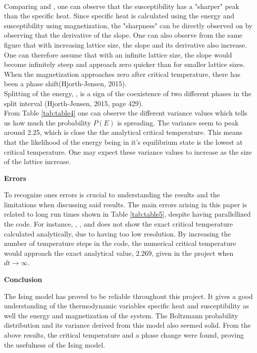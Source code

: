 \documentclass[10pt,a4paper]{article}
\begin{document}
\\
Comparing  and , one can observe that the susceptibility has a "sharper" peak than the specific heat. Since specific heat is calculated using the energy and susceptibility using magnetization, the "sharpness" can be directly observed on  by observing that the derivative of the slope. One can also observe from the same figure that with increasing lattice size, the slope and its derivative also increase. One can therefore assume that with an infinite lattice size, the slope would become infinitely steep and approach zero quicker than for smaller lattice sizes. When the magnetization approaches zero after critical temperature, there has been a phase shift(Hjorth-Jensen, 2015).
\\
Splitting of the energy, , is a sign of the coexistence of two different phases in the split interval (Hjorth-Jensen, 2015, page 429). 
\\
From Table \ref{tab:table4} one can observe the different variance values which tells us how much the probability $P(E)$ is spreading. The variance seem to peak around 2.25, which is close the the analytical critical temperature. This means that the likelihood of the energy being in it's equilibrium state is the lowest at critical temperature. One may expect these variance values to increase as the size of the lattice increase.

\begin{center}
{\LARGE\bf Errors}
\end{center}

\noindent To recognize ones errors is crucial to understanding the results and the limitations when discussing said results. The main errors arising in this paper is related to long run times shown in Table \ref{tab:table5}, despite having parallellized the code. For instance, , ,  and  does not show the exact critical temperature calculated analytically, due to having too low resolution. By increasing the number of temperature steps in the code, the numerical critical temperature would approach the exact analytical value, $2.269$, given in the project when $dt \rightarrow \infty$.

\begin{center}
{\LARGE\bf Conclusion}
\end{center}

\noindent The Ising model has proved to be reliable throughout this project. It gives a good understanding of the thermodynamic variables specific heat and susceptibility as well the energy and magnetization of the system. The Boltzmann probability distribution and its variance derived from this model also seemed solid. From the above results, the critical temperature and a phase change were found, proving the usefulness of the Ising model.
\end{document}
